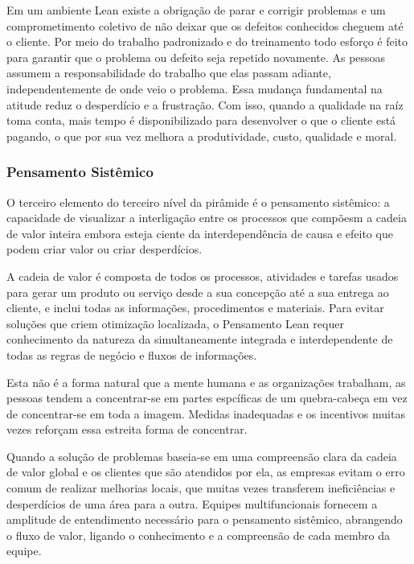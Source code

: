 Em um ambiente Lean existe a obrigação de parar e corrigir problemas e um comprometimento coletivo de não deixar que os defeitos conhecidos cheguem até o cliente. Por meio do trabalho padronizado e do treinamento todo esforço é feito para garantir que o problema ou defeito seja repetido novamente. As pessoas assumem a responsabilidade do trabalho que elas passam adiante, independentemente de onde veio o problema. Essa mudança fundamental na atitude reduz o desperdício e a frustração. Com isso, quando a qualidade na raíz toma conta, mais tempo é disponibilizado para desenvolver o que o cliente está pagando, o que por sua vez melhora a produtividade, custo, qualidade e moral.

\subsubsection[Pensamento Sistêmico]{Pensamento Sistêmico}

O terceiro elemento do terceiro nível da pirâmide é o pensamento sistêmico: a capacidade de visualizar a interligação entre os processos que compõesm a cadeia de valor inteira embora esteja ciente da interdependência de causa e efeito que podem criar valor ou criar desperdícios.

A cadeia de valor é composta de todos os processos, atividades e tarefas usados para gerar um produto ou serviço desde a sua concepção até a sua entrega ao cliente, e inclui todas as informações, procedimentos e materiais. Para evitar soluções que criem otimização localizada, o Pensamento Lean requer conhecimento da natureza da simultaneamente integrada e interdependente  de todas as regras de negócio e fluxos de informações.   

Esta não é a forma natural que a mente humana e as organizações trabalham, as pessoas tendem a concentrar-se em partes espcíficas de um quebra-cabeça em vez de concentrar-se em toda a imagem. Medidas inadequadas e os incentivos muitas vezes reforçam essa estreita forma de concentrar.

Quando a solução de problemas baseia-se em uma compreensão clara da cadeia de valor global e os clientes que são atendidos por ela, as empresas evitam o erro comum de realizar melhorias locais, que muitas vezes transferem ineficiências e desperdícios de uma área para a outra. Equipes multifuncionais fornecem a amplitude de entendimento necessário para o pensamento sistêmico, abrangendo o fluxo de valor, ligando o conhecimento e a compreensão de cada membro da equipe.

